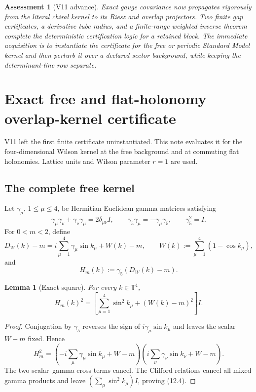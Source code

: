 \documentclass[11pt]{article}
\newtheorem{lemma}[theorem]{Lemma}
\newtheorem{assessment}[theorem]{Assessment}
\begin{document}
\begin{assessment}[V11 advance]
\label{ass:v11v11}
Exact gauge covariance now propagates rigorously from the literal chiral
kernel to its Riesz and overlap projectors.  Two finite gap certificates,
a derivative tube radius, and a finite-range weighted inverse theorem
complete the deterministic certification logic for a retained block.
The immediate acquisition is to instantiate the certificate for the
free or periodic Standard Model kernel and then perturb it over a declared
sector background, while keeping the determinant-line row separate.
\end{assessment}


\section{Exact free and flat-holonomy overlap-kernel certificate}
\label{sec:v11v12}

V11 left the first finite certificate uninstantiated.  This note evaluates
it for the four-dimensional Wilson kernel at the free background and at
commuting flat holonomies.  Lattice units and Wilson parameter \(r=1\)
are used.

\subsection{The complete free kernel}

Let \(\gamma_\mu\), \(1\leq\mu\leq4\), be Hermitian Euclidean gamma
matrices satisfying
\[
 \gamma_\mu\gamma_\nu+\gamma_\nu\gamma_\mu
 =2\delta_{\mu\nu}I,
 \qquad
 \gamma_5\gamma_\mu=-\gamma_\mu\gamma_5,
 \qquad
 \gamma_5^2=I.
 \tag{12.1}
\]
For \(0<m<2\), define
\[
 D_W(k)-m
 =
 i\sum_{\mu=1}^4\gamma_\mu\sin k_\mu
 +W(k)-m,
 \qquad
 W(k):=\sum_{\mu=1}^4(1-\cos k_\mu),
 \tag{12.2}
\]
and
\[
 H_m(k):=\gamma_5(D_W(k)-m).
 \tag{12.3}
\]

\begin{lemma}[Exact square]
\label{lem:v11v12-square}
For every \(k\in\mathbb T^4\),
\[
 H_m(k)^2
 =
 \left[
 \sum_{\mu=1}^4\sin^2k_\mu+(W(k)-m)^2
 \right]I.
 \tag{12.4}
\]
\end{lemma}

\begin{proof}
Conjugation by \(\gamma_5\) reverses the sign of
\(i\gamma_\mu\sin k_\mu\) and leaves the scalar \(W-m\) fixed.  Hence
\[
 H_m^2
 =
 \left(-i\sum_\mu\gamma_\mu\sin k_\mu+W-m\right)
 \left(i\sum_\nu\gamma_\nu\sin k_\nu+W-m\right).
\]
The two scalar--gamma cross terms cancel.  The Clifford relations cancel
all mixed gamma products and leave
\((\sum_\mu\sin^2k_\mu)I\), proving (12.4).
\end{proof}
\end{document}
